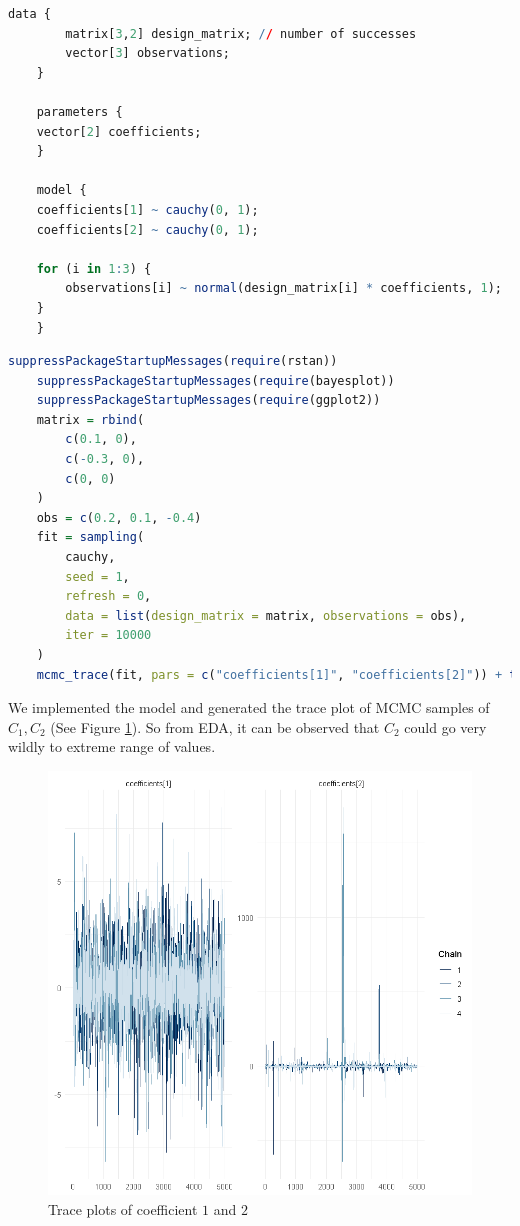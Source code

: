 \documentclass{article}
\begin{document}
\begin{lstlisting}[language=R]
    data {
        matrix[3,2] design_matrix; // number of successes
        vector[3] observations;
    }

    parameters {
    vector[2] coefficients;
    }

    model {
    coefficients[1] ~ cauchy(0, 1);
    coefficients[2] ~ cauchy(0, 1);
    
    for (i in 1:3) {
        observations[i] ~ normal(design_matrix[i] * coefficients, 1);
    }
    }
\end{lstlisting}
\begin{lstlisting}[language=R]
    suppressPackageStartupMessages(require(rstan))
    suppressPackageStartupMessages(require(bayesplot))
    suppressPackageStartupMessages(require(ggplot2))
    matrix = rbind(
        c(0.1, 0),
        c(-0.3, 0),
        c(0, 0)
    )
    obs = c(0.2, 0.1, -0.4)
    fit = sampling(
        cauchy,
        seed = 1,
        refresh = 0,
        data = list(design_matrix = matrix, observations = obs),        
        iter = 10000                   
    )
    mcmc_trace(fit, pars = c("coefficients[1]", "coefficients[2]")) + theme_minimal()
\end{lstlisting}
We implemented the model and generated the trace plot of MCMC samples of $C_1, C_2$ (See Figure \ref{fig:trace}). So from EDA, it can be observed that $C_2$ could go very wildly to extreme range of values.
\begin{figure}[H]
    \centering
    \includegraphics[width=\textwidth, height=0.4\textheight]{trace.png}
    \caption{Trace plots of coefficient $1$ and $2$}
    \label{fig:trace}
\end{figure}
\end{document}

